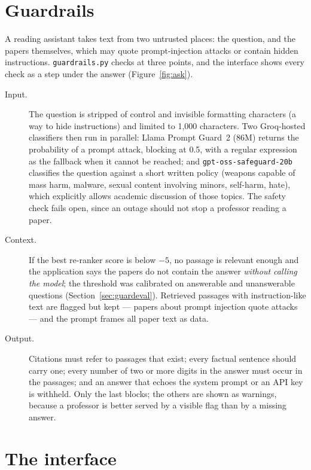 \documentclass[11pt,a4paper]{article}
\newcommand{\code}[1]{\texttt{#1}}
\begin{document}
\section{Guardrails}\label{sec:guardrails}

A reading assistant takes text from two untrusted places: the question, and the papers themselves, which
may quote prompt-injection attacks or contain hidden instructions. \code{guardrails.py} checks at three
points, and the interface shows every check as a step under the answer (Figure~\ref{fig:ask}).
\begin{description}
\item[Input.] The question is stripped of control and invisible formatting characters (a way to hide
  instructions) and limited to 1,000 characters. Two Groq-hosted classifiers then run in parallel:
  Llama Prompt Guard~2 (86M) returns the probability of a prompt attack, blocking at 0.5, with a regular
  expression as the fallback when it cannot be reached; and \code{gpt-oss-safeguard-20b} classifies the
  question against a short written policy (weapons capable of mass harm, malware, sexual content involving
  minors, self-harm, hate), which explicitly allows academic discussion of those topics. The safety check
  fails open, since an outage should not stop a professor reading a paper.
\item[Context.] If the best re-ranker score is below $-5$, no passage is relevant enough and the
  application says the papers do not contain the answer \emph{without calling the model}; the threshold was
  calibrated on answerable and unanswerable questions (Section~\ref{sec:guardeval}). Retrieved passages with
  instruction-like text are flagged but kept --- papers about prompt injection quote attacks --- and the
  prompt frames all paper text as data.
\item[Output.] Citations must refer to passages that exist; every factual sentence should carry one;
  every number of two or more digits in the answer must occur in the passages; and an answer that echoes
  the system prompt or an API key is withheld. Only the last blocks; the others are shown as warnings,
  because a professor is better served by a visible flag than by a missing answer.
\end{description}

\section{The interface}
\end{document}

